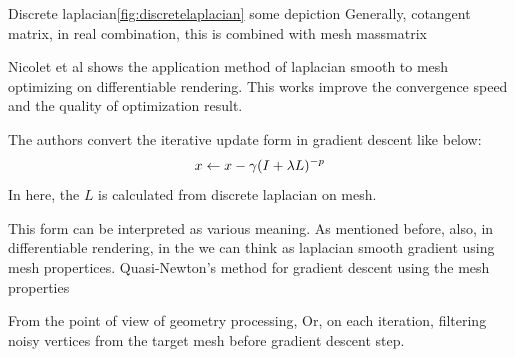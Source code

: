Discrete laplacian\ref{fig:discretelaplacian} some depiction
Generally, cotangent matrix, in real combination, 
this is combined with mesh massmatrix 

Nicolet et al\cite{Nicolet2021Large} shows the application method of laplacian smooth to mesh optimizing on differentiable rendering. This works improve the convergence speed and the quality of optimization result.

The authors convert the iterative update form in gradient descent like below:
\begin{align}{\label{eq1}}
	x \leftarrow x - \gamma (I + \lambda L)^{-p} 
\end{align}
In here, the $L$ is calculated from discrete laplacian on mesh.

This form can be interpreted as various meaning. As mentioned before, 
also, in differentiable rendering, in the 
we can think as laplacian smooth gradient using mesh propertices. 
Quasi-Newton's method for gradient descent using the mesh properties

From the point of view of geometry processing,
Or, on each iteration, filtering noisy vertices from the target mesh before gradient descent step.







